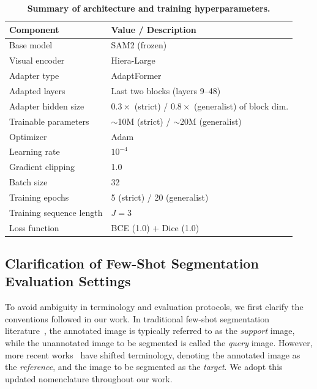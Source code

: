 \begin{table}[h]
\centering
\caption{\textbf{Summary of architecture and training hyperparameters.}}
\vspace{0.5em}
\begin{tabular}{ll}
\toprule
\textbf{Component} & \textbf{Value / Description} \\
\midrule
Base model & SAM2 (frozen) \\
Visual encoder & Hiera-Large~\cite{ryali2023hiera} \\
Adapter type & AdaptFormer~\cite{chen2022adaptformer} \\
Adapted layers & Last two blocks (layers 9–48) \\
Adapter hidden size & $0.3\times$ (strict) / $0.8\times$ (generalist) of block dim. \\
Trainable parameters & $\sim$10M (strict) / $\sim$20M (generalist) \\
Optimizer & Adam \\
Learning rate & $10^{-4}$ \\
Gradient clipping & 1.0 \\
Batch size & 32 \\
Training epochs & 5 (strict) / 20 (generalist) \\
Training sequence length & $J=3$ \\
Loss function & BCE (1.0) + Dice (1.0) \\
\bottomrule
\end{tabular}
\label{tab:implementation-details}
\end{table}

\subsection{Clarification of Few-Shot Segmentation Evaluation Settings}
To avoid ambiguity in terminology and evaluation protocols, we first clarify the conventions followed in our work.
In traditional few-shot segmentation literature~\cite{li2021adaptive, wang2019panet, lang2022learning, liu2022learning, fan2022self}, the annotated image is typically referred to as the \textit{support} image, while the unannotated image to be segmented is called the \textit{query} image. However, more recent works~\cite{sun2024vrp, liu2023matcher, zhang2024bridge} have shifted terminology, denoting the annotated image as the \textit{reference}, and the image to be segmented as the \textit{target}. We adopt this updated nomenclature throughout our work.

